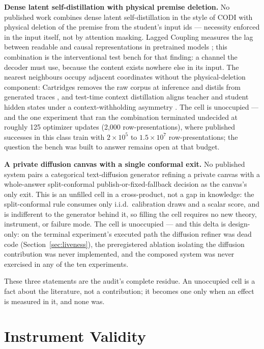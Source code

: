 \documentclass[10pt,a4paper]{article}
\begin{document}
\textbf{Dense latent self-distillation with physical premise deletion.} No published work combines dense latent self-distillation in the style of CODI \cite{codi2025} with physical deletion of the premise from the student's input ids --- necessity enforced in the input itself, not by attention masking. Lagged Coupling measures the lag between readable and causal representations in pretrained models \cite{xun2026lagged}; this combination is the interventional test bench for that finding: a channel the decoder must use, because the content exists nowhere else in its input. The nearest neighbours occupy adjacent coordinates without the physical-deletion component: Cartridges removes the raw corpus at inference and distils from generated traces \cite{eyuboglu2025cartridges}, and test-time context distillation aligns teacher and student hidden states under a context-withholding asymmetry \cite{wang2026ttcd}. The cell is unoccupied --- and the one experiment that ran the combination terminated undecided at roughly 125 optimizer updates (2{,}000 row-presentations), where published successes in this class train with $2\times10^{5}$ to $1.5\times10^{7}$ row-presentations; the question the bench was built to answer remains open at that budget.

\textbf{A private diffusion canvas with a single conformal exit.} No published system pairs a categorical text-diffusion generator \cite{austin2021} refining a private canvas with a whole-answer split-conformal publish-or-fixed-fallback decision \cite{vovk2005,angelopoulos2021} as the canvas's only exit. This is an unfilled cell in a cross-product, not a gap in knowledge: the split-conformal rule consumes only i.i.d.\ calibration draws and a scalar score, and is indifferent to the generator behind it, so filling the cell requires no new theory, instrument, or failure mode. The cell is unoccupied --- and this delta is design-only: on the terminal experiment's executed path the diffusion refiner was dead code (Section~\ref{sec:liveness}), the preregistered ablation isolating the diffusion contribution was never implemented, and the composed system was never exercised in any of the ten experiments.

These three statements are the audit's complete residue. An unoccupied cell is a fact about the literature, not a contribution; it becomes one only when an effect is measured in it, and none was.

\section{Instrument Validity}\label{sec:instruments}
\end{document}
